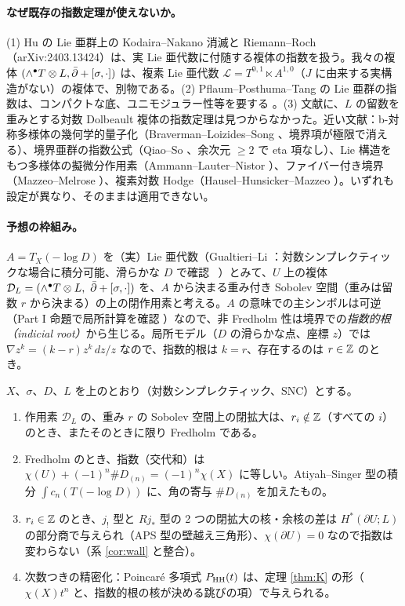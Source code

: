 \paragraph{なぜ既存の指数定理が使えないか。}(1) Hu の Lie 亜群上の Kodaira--Nakano 消滅と Riemann--Roch（arXiv:2403.13424）\cite{Hu}は、実 Lie 亜代数に付随する複体の指数を扱う。我々の複体 $(\wedge^\bullet T\otimes L,\bar\partial+[\sigma,\cdot])$ は、複素 Lie 亜代数 $\mathcal L=T^{0,1}\ltimes A^{1,0}$（$J$ に由来する実構造がない）の複体で、別物である。(2) Pflaum--Posthuma--Tang \cite{PPT} の Lie 亜群の指数は、コンパクトな底、ユニモジュラー性等を要する \tQ。(3) 文献に、$L$ の留数を重みとする対数 Dolbeault 複体の指数定理は見つからなかった。近い文献：b-対称多様体の幾何学的量子化（Braverman--Loizides--Song \cite{BLS}、境界項が極限で消える）、境界亜群の指数公式（Qiao--So \cite{QS}、余次元 $\ge2$ で eta 項なし）、Lie 構造をもつ多様体の擬微分作用素（Ammann--Lauter--Nistor \cite{ALN}）、ファイバー付き境界（Mazzeo--Melrose \cite{MM}）、複素対数 Hodge（Hausel--Hunsicker--Mazzeo \cite{HHM}）。いずれも設定が異なり、そのままは適用できない。

\paragraph{予想の枠組み。}$A=T_X(-\log D)$ を（実）Lie 亜代数（Gualtieri--Li \cite{GL}：対数シンプレクティックな場合に積分可能、滑らかな $D$ で確認 \tC\ \tQ）とみて、$U$ 上の複体 $\mathcal D_L=(\wedge^\bullet T\otimes L,\ \bar\partial+[\sigma,\cdot])$ を、$A$ から決まる重み付き Sobolev 空間（重みは留数 $r$ から決まる）の上の閉作用素と考える。$A$ の意味での主シンボルは可逆（Part I 命題で局所計算を確認 \tV）なので、非 Fredholm 性は境界での\emph{指数的根（indicial root）}から生じる。局所モデル（$D$ の滑らかな点、座標 $z$）では $\nabla z^k=(k-r)z^k\,dz/z$ なので、指数的根は $k=r$、存在するのは $r\in\mathbb Z$ のとき。

\begin{conj}[指数予想\ \tK]\label{conj:index}
$X$、$\sigma$、$D$、$L$ を上のとおり（対数シンプレクティック、SNC）とする。
\begin{enumerate}
\item[(I1)] 作用素 $\mathcal D_L$ の、重み $r$ の Sobolev 空間上の閉拡大は、$r_i\notin\mathbb Z$（すべての $i$）のとき、またそのときに限り Fredholm である。
\item[(I2)] Fredholm のとき、指数（交代和）は $\chi(U)+(-1)^n\#D_{(n)}=(-1)^n\chi(X)$ に等しい。Atiyah--Singer 型の積分 $\int c_n(T(-\log D))$ に、角の寄与 $\#D_{(n)}$ を加えたもの。
\item[(I3)] $r_i\in\mathbb Z$ のとき、$j_!$ 型と $Rj_*$ 型の 2 つの閉拡大の核・余核の差は $H^*(\partial U;L)$ の部分商で与えられ（APS 型の壁越え三角形）、$\chi(\partial U)=0$ なので指数は変わらない（系 \ref{cor:wall} と整合）。
\item[(I4)] 次数つきの精密化：Poincar\'e 多項式 $P_{\mathrm{HH}}(t)$ は、定理 \ref{thm:K} の形（$\chi(X)t^n$ と、指数的根の核が決める跳びの項）で与えられる。
\end{enumerate}
\end{conj}
